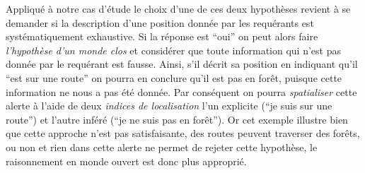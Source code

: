 Appliqué à notre cas d'étude le choix d'une de ces deux hypothèses
revient à se demander si la description d'une position donnée par les
requérants est systématiquement exhaustive. Si la réponse est
\enquote{oui} on peut alors faire \emph{l'hypothèse d'un monde clos}
et considérer que toute information qui n'est pas donnée par le
requérant est fausse. Ainsi, s'il décrit sa position en indiquant
qu'il \enquote{est sur une route} on pourra en conclure qu'il est pas
en forêt, puisque cette information ne nous a pas été donnée. Par
conséquent on pourra \emph{spatialiser} cette alerte à l'aide de deux
\emph{indices de localisation} l'un explicite (\enquote{je suis sur
  une route}) et l'autre inféré (\enquote{je ne suis pas en
  forêt}). Or cet exemple illustre bien que cette approche n'est pas
satisfaisante, des routes peuvent traverser des forêts, ou non et rien
dans cette alerte ne permet de rejeter cette hypothèse, le
raisonnement en monde ouvert est donc plus approprié.

